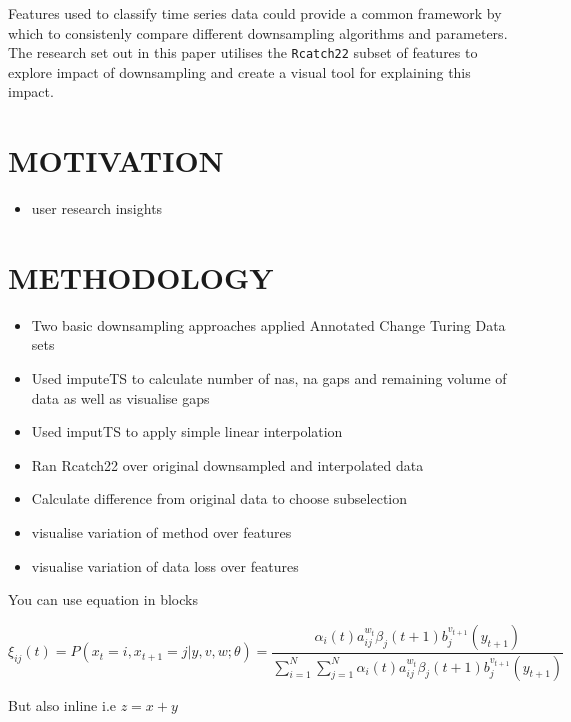 \documentclass{article}
\providecommand{\tightlist}{%
  \setlength{\itemsep}{0pt}\setlength{\parskip}{0pt}}
\begin{document}
Features used to classify time series data could provide a common
framework by which to consistenly compare different downsampling
algorithms and parameters. The research set out in this paper utilises
the \texttt{Rcatch22} subset of features to explore impact of
downsampling and create a visual tool for explaining this impact.

\hypertarget{motivation}{%
\section{MOTIVATION}\label{motivation}}

\label{sec:headings}

\begin{itemize}
\tightlist
\item
  user research insights
\end{itemize}

\hypertarget{methodology}{%
\section{METHODOLOGY}\label{methodology}}

\label{sec:headings}

\begin{itemize}
\item
  Two basic downsampling approaches applied Annotated Change Turing Data
  sets
\item
  Used imputeTS to calculate number of nas, na gaps and remaining volume
  of data as well as visualise gaps
\item
  Used imputTS to apply simple linear interpolation
\item
  Ran Rcatch22 over original downsampled and interpolated data
\item
  Calculate difference from original data to choose subselection
\item
  visualise variation of method over features
\item
  visualise variation of data loss over features
\end{itemize}

\onecolumn

You can use equation in blocks

\[
\xi _{ij}(t)=P(x_{t}=i,x_{t+1}=j|y,v,w;\theta)= {\frac {\alpha _{i}(t)a^{w_t}_{ij}\beta _{j}(t+1)b^{v_{t+1}}_{j}(y_{t+1})}{\sum _{i=1}^{N} \sum _{j=1}^{N} \alpha _{i}(t)a^{w_t}_{ij}\beta _{j}(t+1)b^{v_{t+1}}_{j}(y_{t+1})}}
\]

But also inline i.e \(z=x+y\)
\end{document}
